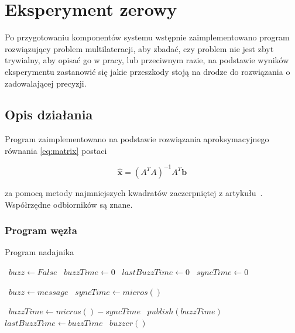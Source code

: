 \chapter{Eksperyment zerowy}\label{chap:experiment_zero}

Po przygotowaniu komponentów systemu wstępnie zaimplementowano program rozwiązujący problem multilateracji, aby zbadać, czy problem nie jest zbyt trywialny, aby opisać go w pracy, lub przeciwnym razie, na podstawie wyników eksperymentu zastanowić się jakie przeszkody stoją na drodze do rozwiązania o zadowalającej precyzji.

\section{Opis działania}

Program zaimplementowano na podstawie rozwiązania aproksymacyjnego równania \ref{eq:matrix} postaci

\begin{equation}
    \label{eq:lls}
    \hat{\boldsymbol{x}} = {\left(A^T A\right)}^{-1} A^T \boldsymbol{b}
\end{equation}

za pomocą metody najmniejszych kwadratów zaczerpniętej z artykułu~\cite{norrdine2012algebraic}. Współrzędne odbiorników są znane.

\subsection{Program węzła}

\begin{algorithm}
\caption{Program nadajnika}\label{alg:source}
\begin{algorithmic}[1]
    \State\ $buzz \gets False$
    \State\ $buzzTime \gets 0$
    \State\ $lastBuzzTime \gets 0$
    \State\ $syncTime \gets 0$

            \State\ $buzz \gets message$
        \EndIf
            \State\ $syncTime \gets micros()$
        \EndIf
    \EndFunction

    \Loop
            \State\ $buzzTime \gets micros() - syncTime$
            \State\ $publish(buzzTime)$
            \State\ $lastBuzzTime \gets buzzTime$
            \State\ $buzzer()$
        \EndIf
    \EndLoop
\end{algorithmic}
\end{algorithm}

